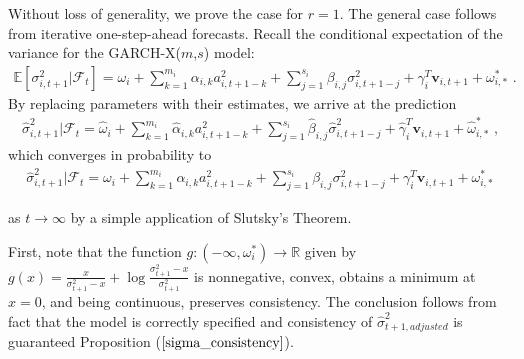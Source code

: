 \documentclass[11pt,3p,review,authoryear]{elsarticle}
\newcommand{\x}{\textbf{v}}
\def\E{\mathbb{E}} %
\theoremstyle{definition}
\newenvironment{proof-of-proposition}[1][{}]{\noindent{\bf
    Proof of Proposition {#1}}
  \hspace*{.5em}}{\qed\bigskip\\}
\begin{document}
    \begin{proof-of-proposition}[\ref{sigma_consistency}]
      Without loss of generality, we prove the case for $r = 1$.  The general case follows from iterative one-step-ahead forecasts.  Recall the conditional expectation of the variance for the GARCH-X($m$,$s$) model:
      \begin{align*}
      \E[\sigma^{2}_{i,t+1}|\mathcal{F}_{t}] = \omega_{i} +  \sum^{m_{i}}_{k=1}\alpha_{i,k}a^{2}_{i,t+1-k} + \sum_{j=1}^{s_{i}}\beta_{i,j}\sigma_{i,t+1-j}^{2} + \gamma_{i}^{T} \x_{i,t+1} + \omega^{*}_{i,*} \text{ .}
      \end{align*}
      By replacing parameters with their estimates, we arrive at the prediction 
      \begin{align*}
      \hat\sigma^{2}_{i,t+1}|\mathcal{F}_{t} = \hat\omega_{i} + \sum^{m_{i}}_{k=1}\hat\alpha_{i,k}a^{2}_{i,t+1-k} + \sum_{j=1}^{s_{i}}\hat\beta_{i,j}\hat\sigma_{i,t+1-j}^{2} + \hat\gamma_{i}^{T} \x_{i,t+1} + \hat\omega^{*}_{i,*}\text { ,}
      \end{align*}
      which converges in probability to 
      \begin{align*}
        \hat\sigma^{2}_{i,t+1}|\mathcal{F}_{t} = \omega_{i} + \sum^{m_{i}}_{k=1}\alpha_{i,k}a^{2}_{i,t+1-k} + \sum_{j=1}^{s_{i}}\beta_{i,j}\sigma_{i,t+1-j}^{2} + \gamma_{i}^{T} \x_{i,t+1} + \omega^{*}_{i,*}
        \end{align*}
      
      as $t\rightarrow\infty$ by a simple application of Slutsky's Theorem.
      \end{proof-of-proposition}

  \begin{proof-of-proposition}[\ref{asymptotic_consistency}]
    First, note that the function $g:(-\infty,\omega_{i}^{*})\rightarrow \mathbb{R}$ given by $g(x) = \frac{x}{\sigma^{2}_{t+1}-x} + \log{\frac{\sigma_{t+1}^{2}-x}{\sigma_{t+1}^{2}} }$ is nonnegative, convex, obtains a minimum at $x = 0$, and being continuous, preserves consistency. The conclusion follows from fact that the model is correctly specified and consistency of $\hat\sigma^{2}_{t+1, adjusted}$ is guaranteed Proposition ($\ref{sigma_consistency}$). 
  \end{proof-of-proposition}
  
\clearpage


\end{document}
